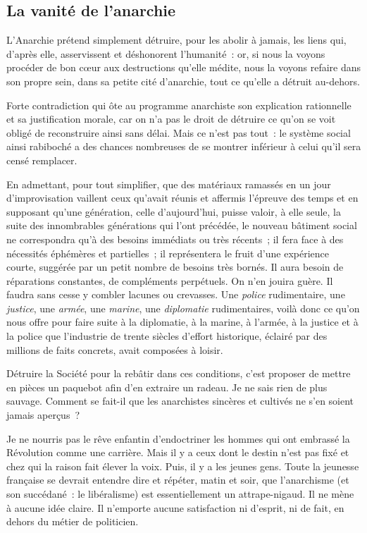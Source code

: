 \documentclass[french,twoside]{book} %
\newcommand{\astermono}{\medskip\centerline{\color{rubric}\large\selectfont{\syms ✻}}\medskip\par}%
\begin{document}
\astermono

\subsection[{La vanité de l’anarchie}]{La vanité de l’anarchie}
\noindent L’Anarchie prétend simplement détruire, pour les abolir à jamais, les liens qui, d’après elle, asservissent et déshonorent l’humanité : or, si nous la voyons procéder de bon cœur aux destructions qu’elle médite, nous la voyons refaire dans son propre sein, dans sa petite cité d’anarchie, tout ce qu’elle a détruit au-dehors.\par
Forte contradiction qui ôte au programme anarchiste son explication rationnelle et sa justification morale, car on n’a pas le droit de détruire ce qu’on se voit obligé de reconstruire ainsi sans délai. Mais ce n’est pas tout : le système social ainsi rabiboché a des chances nombreuses de se montrer inférieur à celui qu’il sera censé remplacer.\par
En admettant, pour tout simplifier, que des matériaux ramassés en un jour d’improvisation vaillent ceux qu’avait réunis et affermis l’épreuve des temps et en supposant qu’une génération, celle d’aujourd’hui, puisse valoir, à elle seule, la suite des innombrables générations qui l’ont précédée, le nouveau bâtiment social ne correspondra qu’à des besoins immédiats ou très récents ; il fera face à des nécessités éphémères et partielles ; il représentera le fruit d’une expérience courte, suggérée par un petit nombre de besoins très bornés. Il aura besoin de réparations constantes, de compléments perpétuels. On n’en jouira guère. Il faudra sans cesse y combler lacunes ou crevasses. Une \emph{police} rudimentaire, une \emph{justice}, une \emph{armée}, une \emph{marine}, une \emph{diplomatie} rudimentaires, voilà donc ce qu’on nous offre pour faire suite à la diplomatie, à la marine, à l’armée, à la justice et à la police que l’industrie de trente siècles d’effort historique, éclairé par des millions de faits concrets, avait composées à loisir.\par

\astermono

\noindent Détruire la Société pour la rebâtir dans ces conditions, c’est proposer de mettre en pièces un paquebot afin d’en extraire un radeau. Je ne sais rien de plus sauvage. Comment se fait-il que les anarchistes sincères et cultivés ne s’en soient jamais aperçus ?\par
Je ne nourris pas le rêve enfantin d’endoctriner les hommes qui ont embrassé la Révolution comme une carrière. Mais il y a ceux dont le destin n’est pas fixé et chez qui la raison fait élever la voix. Puis, il y a les jeunes gens. Toute la jeunesse française se devrait entendre dire et répéter, matin et soir, que l’anarchisme (et son succédané : le libéralisme) est essentiellement un attrape-nigaud. Il ne mène à aucune idée claire. Il n’emporte aucune satisfaction ni d’esprit, ni de fait, en dehors du métier de politicien.\par
\end{document}
